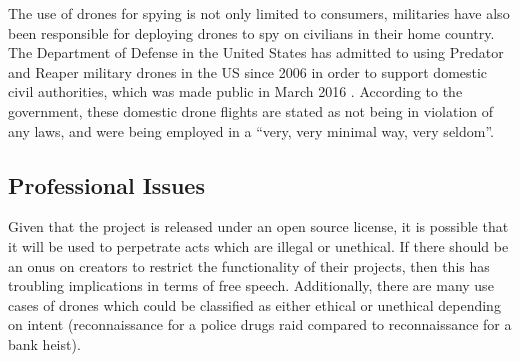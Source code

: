 The use of drones for spying is not only limited to consumers, militaries have also been responsible for deploying drones to spy on civilians in their home country. The Department of Defense in the United States has admitted to using Predator and Reaper military drones in the US since 2006 in order to support domestic civil authorities, which was made public in March 2016 \cite{pentagon2016}. According to the government, these domestic drone flights are stated as not being in violation of any laws, and were being employed in a “very, very minimal way, very seldom”.

\subsection{Professional Issues}
Given that the project is released under an open source license, it is possible that it will be used to perpetrate acts which are illegal or unethical. If there should be an onus on creators to restrict the functionality of their projects, then this has troubling implications in terms of free speech. Additionally, there are many use cases of drones which could be classified as either ethical or unethical depending on intent (reconnaissance for a police drugs raid compared to reconnaissance for a bank heist). 
